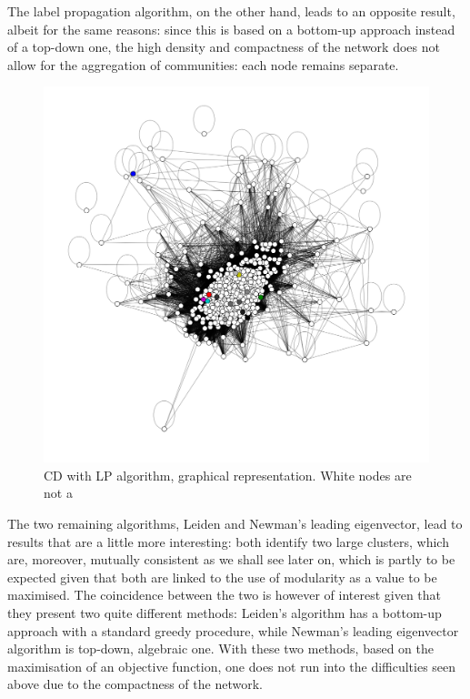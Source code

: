 \documentclass[sigchi]{acmart}
\begin{document}
The label propagation algorithm, on the other hand, leads to an opposite result, albeit for the same reasons: since this is based on a bottom-up approach instead of a top-down one, the high density and compactness of the network does not allow for the aggregation of communities: each node remains separate.

\begin{figure}[h]
	\centering
	\includegraphics[width=\linewidth]{CD_lp.png}
	\caption{CD with LP algorithm, graphical representation. White nodes are not a }
\end{figure}

The two remaining algorithms, Leiden and Newman's leading eigenvector, lead to results that are a little more interesting: both identify two large clusters, which are, moreover, mutually consistent as we shall see later on, which is partly to be expected given that both are linked to the use of modularity as a value to be maximised. The coincidence between the two is however of interest given that they present two quite different methods: Leiden's algorithm has a bottom-up approach with a standard greedy procedure, while Newman’s leading eigenvector algorithm is top-down, algebraic one. 
With these two methods, based on the maximisation of an objective function, one does not run into the difficulties seen above due to the compactness of the network.
\end{document}
